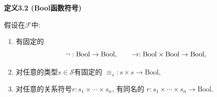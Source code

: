 \documentclass[UTF8]{ctexart}
\begin{document}
\vspace{10pt}

\hypertarget{sec:定义3.2}{}
\noindent\textbf{定义3.2 (Bool函数符号)}

假设在$\mathcal{F}$中:
\begin{enumerate}
    \item 有固定的
    \[
        \neg:\mathrm{Bool}\to\mathrm{Bool},\qquad
        \to:\mathrm{Bool}\times\mathrm{Bool}\to\mathrm{Bool},\\[-3pt]
    \]
    \item 对任意的类型$s\in\mathcal{S}$有固定的
    $\equiv_s:s\times s\to\mathrm{Bool}$,
    \item 对任意的关系符号$r:s_1\times\cdots\times s_n$, 有同名的
    $r:s_1\times\cdots\times s_n\to\mathrm{Bool}$.
\end{enumerate}
\end{document}
